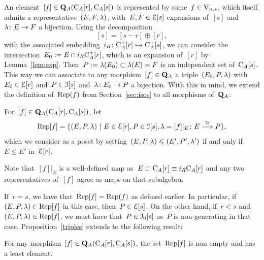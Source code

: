 An element~$[f]\in \mathbf{Q}_A(\mathrm{C}_A[r],\mathrm{C}_A[s])$ is represented by some~$f\in \mathrm{V}_{n,s}$, which itself admits a representative~$(E,F,\lambda)$, with~$E,F\in \mathcal{E}[s]$ expansions of~$[s]$ and~$\lambda\colon E\to F$ a bijection. Using the decomposition 
$$[s]=[s-r]\oplus [r],$$ 
with the associated embedding~$i_R\colon\mathrm{C}_A^+[r]\hookrightarrow \mathrm{C}_A^+[s]$, 
we can consider the intersection~$E_0:=E\cap i_R\mathrm{C}_A^+[r]$, which is an expansion of~$[r]$ by Lemma~\ref{lem:exp}. Then~\hbox{$P:=\lambda(E_0)\subset \lambda(E)=F$} is an independent set of~$\mathrm{C}_A[s]$. This way we can associate to any morphism~$[f]\in \mathbf{Q}_A$ a triple~$(E_0,P,\lambda)$ with~$E_0\in \mathcal{E}[r]$ and~$P\in \mathcal{I}[s]$ and~$\lambda\colon E_0\to P$ a bijection. 
With this in mind, we extend the definition of~$\operatorname{Rep}(f)$ from Section~\ref{sec:isos} to all morphisms of~$\mathbf{Q}_A$: 
\begin{Def}
For~$[f]\in \mathbf{Q}_A(\mathrm{C}_A[r],\mathrm{C}_A[s])$, let 
$$\operatorname{Rep}[f]=\{(E,P,\lambda)\ |\ E\in \mathcal{E}[r], P\in \mathcal{I}[s], \lambda=[f]|_E\colon E\stackrel{\cong}{\longrightarrow} P\},$$
which we consider as a poset by setting~$(E,P,\lambda)\leqslant (E',P',\lambda')$ if and only if~$E\le E'$ in~$\mathcal{E}[r]$.  
\end{Def}

Note that~$[f]|_E$ is a well-defined map as~$E\subset \mathrm{C}_A[r]\equiv i_R\mathrm{C}_A[r]$ and any two representatives of~$[f]$ agree as maps on that subalgebra. 

If~$r=s$, we have that~$\operatorname{Rep}[f]=\operatorname{Rep}(f)$ as defined earlier. In particular, if~$(E,P,\lambda)\in \operatorname{Rep}[f]$ in this case, then~$P\in \mathcal{E}[s]$. On the other hand, if~$r<s$ and~$(E,P,\lambda)\in \operatorname{Rep}[f]$, we must have that~$P\in \mathcal{I}_0[s]$ as~$P$ is non-generating in that case. 
Proposition~\ref{triples} extends to the following result: 

\begin{prop}\label{triples2}
For any morphism~$[f]\in \mathbf{Q}_A(\mathrm{C}_A[r],\mathrm{C}_A[s])$, the set~$\operatorname{Rep}[f]$ is non-empty and has a least element. 
\end{prop}


